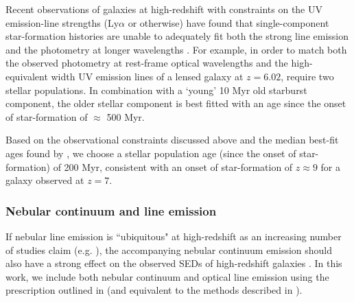 
Recent observations of galaxies at high-redshift with constraints on the UV emission-line strengths (Ly$\alpha$ or otherwise) have found that single-component star-formation histories are unable to adequately fit both the strong line emission and the photometry at longer wavelengths \citep{RodriguezEspinosa:2014cs,Stark:2014vc}. For example, in order to match both the observed photometry at rest-frame optical wavelengths and the high-equivalent width UV emission lines of a lensed galaxy at $z = 6.02$, \citet{Stark:2014vc} require two stellar populations. In combination with a `young' 10 Myr old starburst component, the older stellar component is best fitted with an age since the onset of star-formation of $\approx$ 500 Myr.

Based on the observational constraints discussed above and the median best-fit ages found by \citet{2013MNRAS.429..302C}, we choose a stellar population age (since the onset of star-formation) of 200 Myr, consistent with an onset of star-formation of $z \approx 9$ for a galaxy observed at $z = 7$.

\subsubsection{Nebular continuum and line emission}\label{sec:neb}
If nebular line emission is ``ubiquitous" at high-redshift as an increasing number of studies claim (e.g. \citet{Shim:2011cw,Stark:2013ix,Smit:2013ud}), the accompanying nebular continuum emission should also have a strong effect on the observed SEDs of high-redshift galaxies \citep{Reines:2009gs}. In this work, we include both nebular continuum and optical line emission using the prescription outlined in \citet{Duncan:2014gh} (and equivalent to the methods described in \citet{Ono:2010ed,2010A&A...515A..73S,2011MNRAS.418.2074M}). 

